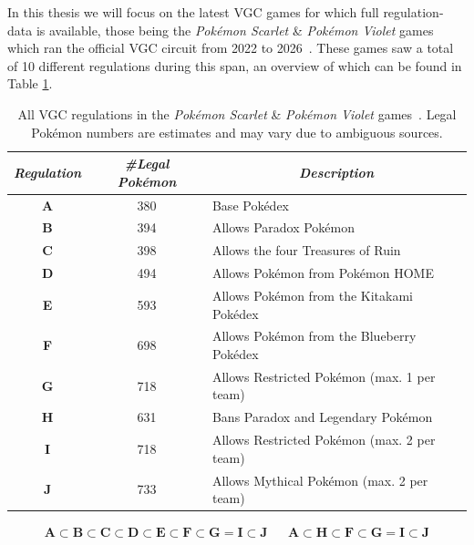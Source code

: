 In this thesis we will focus on the latest VGC games for which full regulation-data is available, those being the \textit{Pokémon Scarlet} \& \textit{Pokémon Violet} games which ran the official VGC circuit from 2022 to 2026~\cite{vgc-rules-regulations}.
These games saw a total of 10 different regulations during this span, an overview of which can be found in Table \ref{tab:regulations}.

\begin{table}[ht]
\centering
    \begin{tabular}{ccl}
    \textit{Regulation} & \textit{\#Legal Pokémon} & \multicolumn{1}{c}{\textit{Description}} \\ \hline
    \textbf{A} & 380 & Base Pokédex \\
    \textbf{B} & 394 & Allows Paradox Pokémon \\
    \textbf{C} & 398 & Allows the four Treasures of Ruin \\
    \textbf{D} & 494 & Allows Pokémon from Pokémon HOME \\
    \textbf{E} & 593 & Allows Pokémon from the Kitakami Pokédex \\
    \textbf{F} & 698 & Allows Pokémon from the Blueberry Pokédex \\
    \textbf{G} & 718 & Allows Restricted Pokémon (max. 1 per team) \\
    \textbf{H} & 631 & Bans Paradox and Legendary Pokémon \\
    \textbf{I} & 718 & Allows Restricted Pokémon (max. 2 per team) \\
    \textbf{J} & 733 & Allows Mythical Pokémon (max. 2 per team) \\ \hline
    \end{tabular}
    \caption{All VGC regulations in the \textit{Pokémon Scarlet} \& \textit{Pokémon Violet} games~\cite{vgc-rules-regulations}. Legal Pokémon numbers are estimates and may vary due to ambiguous sources.}
    \label{tab:regulations}
\end{table}
\vspace{-\baselineskip} %
\begin{align} \label{eq:regulations}
    \textbf{A} \subset \textbf{B} \subset \textbf{C} \subset \textbf{D} \subset \textbf{E} \subset \textbf{F} \subset \textbf{G} = \textbf{I} \subset \textbf{J} && \textbf{A} \subset \textbf{H} \subset \textbf{F} \subset \textbf{G} = \textbf{I} \subset \textbf{J}
\end{align}


